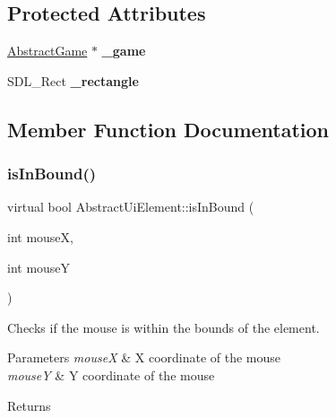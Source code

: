 \subsection*{Protected Attributes}
\begin{DoxyCompactItemize}
\item 
\mbox{\label{class_abstract_ui_element_ad80a25aa84eb844afd1c5e091063e8fb}} 
\mbox{\hyperlink{class_abstract_game}{Abstract\+Game}} $\ast$ {\bfseries \+\_\+game}
\item 
\mbox{\label{class_abstract_ui_element_a91aa849cd7db2aac4b7dd36d6094961d}} 
S\+D\+L\+\_\+\+Rect {\bfseries \+\_\+rectangle}
\end{DoxyCompactItemize}


\subsection{Member Function Documentation}
\mbox{\label{class_abstract_ui_element_ad2c415461cd7e8c1ee50b1105eb84685}} 
\subsubsection{\texorpdfstring{is\+In\+Bound()}{isInBound()}}
{\footnotesize\ttfamily virtual bool Abstract\+Ui\+Element\+::is\+In\+Bound (\begin{DoxyParamCaption}\item[{int}]{mouseX,  }\item[{int}]{mouseY }\end{DoxyParamCaption})\hspace{0.3cm}{\ttfamily [pure virtual]}}



Checks if the mouse is within the bounds of the element. 


\begin{DoxyParams}{Parameters}
{\em mouseX} & X coordinate of the mouse\\
\hline
{\em mouseY} & Y coordinate of the mouse\\
\hline
\end{DoxyParams}
\begin{DoxyReturn}{Returns}

\end{DoxyReturn}


